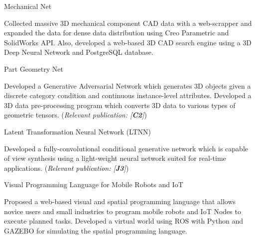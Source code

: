 


\begin{cventries}

\cvpub
{Mechanical Net} %
{ %
\begin{cvitems}
\item {Collected massive 3D mechanical component CAD data with a web-scrapper and expanded the data for dense data distribution using Creo Parametric and SolidWorks API. Also, developed a web-based 3D CAD search engine using a 3D Deep Neural Network and PostgreSQL database.}
\end{cvitems}
}

\cvpub
{Part Geometry Net} %
{ %
\begin{cvitems}
\item {Developed a Generative Adversarial Network which generates 3D objects given a discrete category condition and continuous instance-level attributes. Developed a 3D data pre-processing program which converts 3D data to various types of geometric tensors. (\textit{Relevant publication: [\textbf{C2}]})}
\end{cvitems}
}


\cvpub
{Latent Transformation Neural Network (LTNN)} %
{ %
\begin{cvitems}
\item {Developed a fully-convolutional conditional generative network which is capable of view synthesis using a light-weight neural network suited for real-time applications. (\textit{Relevant publication: [\textbf{J3}]})}
\end{cvitems}
}


\cvpub
{Visual Programming Language for Mobile Robots and IoT} %
{ %
\begin{cvitems}
\item {Proposed a web-based visual and spatial programming language that allows novice users and small industries to program mobile robots and IoT Nodes to execute planned tasks. Developed a virtual world using ROS with Python and GAZEBO for simulating the spatial programming language.}
\end{cvitems} 
}


\end{cventries}

